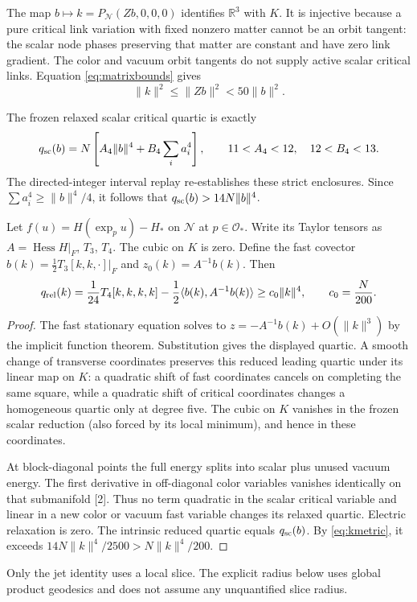 \documentclass[11pt,a4paper]{article}
\begin{document}
The map $b\mapsto k=P_{\mathcal N}(Zb,0,0,0)$ identifies $\mathbb R^3$ with $K$. It is injective because a pure critical link variation with fixed nonzero matter cannot be an orbit tangent: the scalar node phases preserving that matter are constant and have zero link gradient. The color and vacuum orbit tangents do not supply active scalar critical links. Equation \eqref{eq:matrixbounds} gives
\begin{equation}\label{eq:kmetric}
\|k\|^2\le\|Zb\|^2<50\|b\|^2.
\end{equation}

The frozen relaxed scalar critical quartic is exactly
\[
q_{\rm sc}(b)=N\left[A_4\|b\|^4+B_4\sum_i a_i^4\right],
\qquad 11<A_4<12,\quad12<B_4<13.
\]
The directed-integer interval replay re-establishes these strict enclosures. Since $\sum a_i^4\ge\|b\|^4/4$, it follows that $q_{\rm sc}(b)>14N\|b\|^4$.

\begin{lemma}\label{lem:quartic}
Let $f(u)=H(\exp_p u)-H_*$ on $\mathcal N$ at $p\in\mathcal O_*$. Write its Taylor tensors as $A=\operatorname{Hess}H|_F$, $T_3$, $T_4$. The cubic on $K$ is zero. Define the fast covector $b(k)=\tfrac12T_3[k,k,\cdot]|_F$ and $z_0(k)=A^{-1}b(k)$. Then
\[
q_{\rm rel}(k)=\frac1{24}T_4[k,k,k,k]
-\frac12\langle b(k),A^{-1}b(k)\rangle
\ge c_0\|k\|^4,\qquad c_0=\frac N{200}.
\]
\end{lemma}
\begin{proof}
The fast stationary equation solves to $z=-A^{-1}b(k)+O(\|k\|^3)$ by the implicit function theorem. Substitution gives the displayed quartic. A smooth change of transverse coordinates preserves this reduced leading quartic under its linear map on $K$: a quadratic shift of fast coordinates cancels on completing the same square, while a quadratic shift of critical coordinates changes a homogeneous quartic only at degree five. The cubic on $K$ vanishes in the frozen scalar reduction (also forced by its local minimum), and hence in these coordinates.

At block-diagonal points the full energy splits into scalar plus unused vacuum energy. The first derivative in off-diagonal color variables vanishes identically on that submanifold [2]. Thus no term quadratic in the scalar critical variable and linear in a new color or vacuum fast variable changes its relaxed quartic. Electric relaxation is zero. The intrinsic reduced quartic equals $q_{\rm sc}(b)$. By \eqref{eq:kmetric}, it exceeds $14N\|k\|^4/2500>N\|k\|^4/200$.
\end{proof}
Only the jet identity uses a local slice. The explicit radius below uses global product geodesics and does not assume any unquantified slice radius.
\newpage
\end{document}
